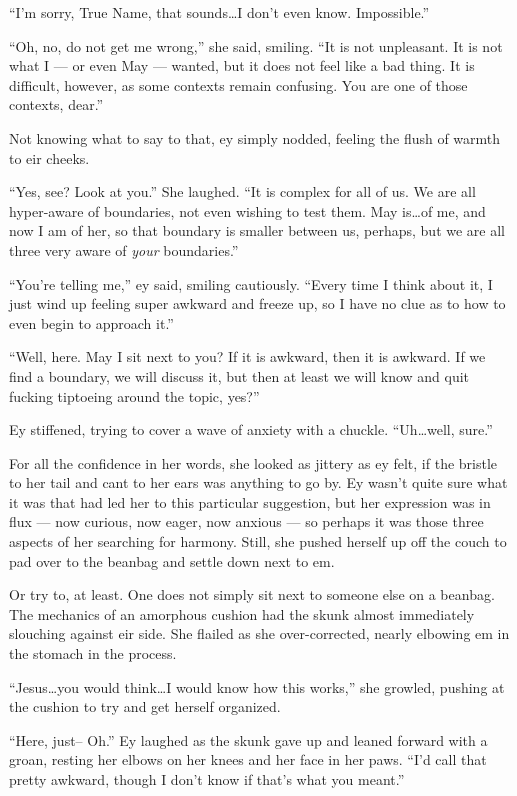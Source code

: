 ``I'm sorry, True Name, that sounds\ldots I don't even know. Impossible.''

``Oh, no, do not get me wrong,'' she said, smiling. ``It is not unpleasant. It is not what I — or even May — wanted, but it does not feel like a bad thing. It is difficult, however, as some contexts remain confusing. You are one of those contexts, dear.''

Not knowing what to say to that, ey simply nodded, feeling the flush of warmth to eir cheeks.

``Yes, see? Look at you.'' She laughed. ``It is complex for all of us. We are all hyper-aware of boundaries, not even wishing to test them. May is\ldots of me, and now I am of her, so that boundary is smaller between us, perhaps, but we are all three very aware of \emph{your} boundaries.''

``You're telling me,'' ey said, smiling cautiously. ``Every time I think about it, I just wind up feeling super awkward and freeze up, so I have no clue as to how to even begin to approach it.''

``Well, here. May I sit next to you? If it is awkward, then it is awkward. If we find a boundary, we will discuss it, but then at least we will know and quit fucking tiptoeing around the topic, yes?''

Ey stiffened, trying to cover a wave of anxiety with a chuckle. ``Uh\ldots well, sure.''

For all the confidence in her words, she looked as jittery as ey felt, if the bristle to her tail and cant to her ears was anything to go by. Ey wasn't quite sure what it was that had led her to this particular suggestion, but her expression was in flux — now curious, now eager, now anxious — so perhaps it was those three aspects of her searching for harmony. Still, she pushed herself up off the couch to pad over to the beanbag and settle down next to em.

Or try to, at least. One does not simply sit next to someone else on a beanbag. The mechanics of an amorphous cushion had the skunk almost immediately slouching against eir side. She flailed as she over-corrected, nearly elbowing em in the stomach in the process.

``Jesus\ldots you would think\ldots I would know how this works,'' she growled, pushing at the cushion to try and get herself organized.

``Here, just-- Oh.'' Ey laughed as the skunk gave up and leaned forward with a groan, resting her elbows on her knees and her face in her paws. ``I'd call that pretty awkward, though I don't know if that's what you meant.''

